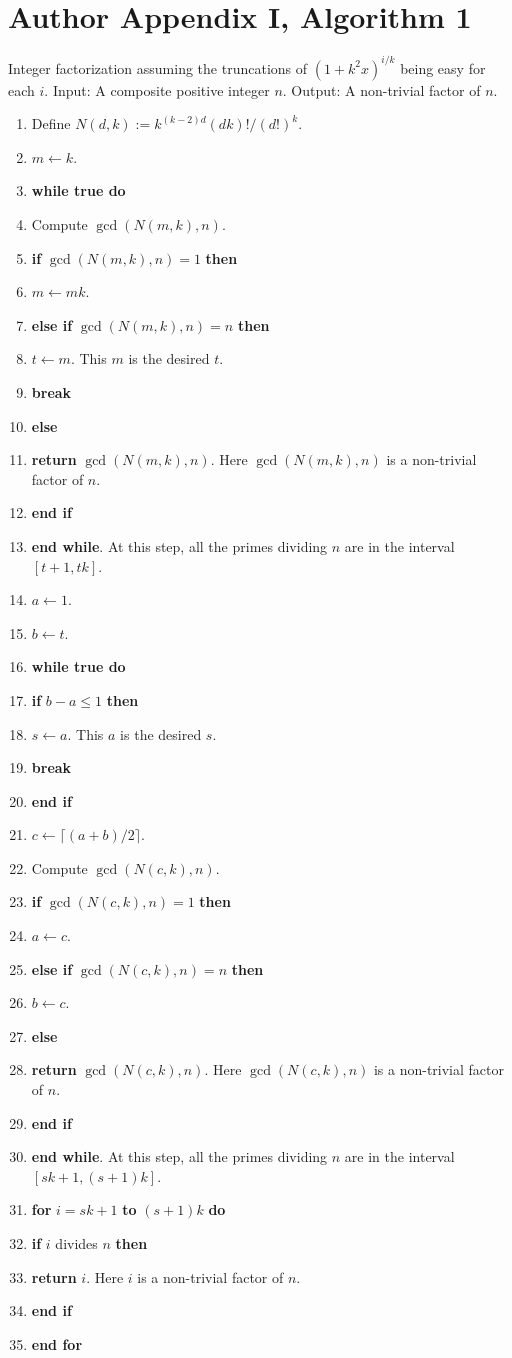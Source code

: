 \documentclass[10pt,a4paper]{article}
\begin{document}
\section*{Author Appendix I, Algorithm 1}
Integer factorization assuming the truncations of $(1+k^2x)^{i/k}$ being easy for each $i$. Input: A composite positive integer $n$. Output: A non-trivial factor of $n$.
\begin{enumerate}
\item Define $N(d,k):=k^{(k-2)d}(dk)!/(d!)^k$.
\item $m\leftarrow k$.
\item \textbf{while true do}
\item Compute $\gcd(N(m,k),n)$.
\item \textbf{if} $\gcd(N(m,k),n)=1$ \textbf{then}
\item $m\leftarrow mk$.
\item \textbf{else if} $\gcd(N(m,k),n)=n$ \textbf{then}
\item $t\leftarrow m$. This $m$ is the desired $t$.
\item \textbf{break}
\item \textbf{else}
\item \textbf{return} $\gcd(N(m,k),n)$. Here $\gcd(N(m,k),n)$ is a non-trivial factor of $n$.
\item \textbf{end if}
\item \textbf{end while}. At this step, all the primes dividing $n$ are in the interval $[t+1,tk]$.
\item $a\leftarrow1$.
\item $b\leftarrow t$.
\item \textbf{while true do}
\item \textbf{if} $b-a\le1$ \textbf{then}
\item $s\leftarrow a$. This $a$ is the desired $s$.
\item \textbf{break}
\item \textbf{end if}
\item $c\leftarrow\lceil(a+b)/2\rceil$.
\item Compute $\gcd(N(c,k),n)$.
\item \textbf{if} $\gcd(N(c,k),n)=1$ \textbf{then}
\item $a\leftarrow c$.
\item \textbf{else if} $\gcd(N(c,k),n)=n$ \textbf{then}
\item $b\leftarrow c$.
\item \textbf{else}
\item \textbf{return} $\gcd(N(c,k),n)$. Here $\gcd(N(c,k),n)$ is a non-trivial factor of $n$.
\item \textbf{end if}
\item \textbf{end while}. At this step, all the primes dividing $n$ are in the interval $[sk+1,(s+1)k]$.
\item \textbf{for} $i=sk+1$ \textbf{to} $(s+1)k$ \textbf{do}
\item \textbf{if} $i$ divides $n$ \textbf{then}
\item \textbf{return} $i$. Here $i$ is a non-trivial factor of $n$.
\item \textbf{end if}
\item \textbf{end for}
\end{enumerate}
\end{document}
